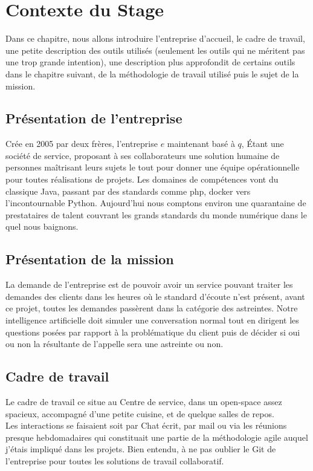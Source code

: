 
\chapter{Contexte du Stage}
Dans ce chapitre, nous allons introduire l'entreprise d'accueil, le cadre de travail, une petite description des outils utilisés (seulement les outils qui ne méritent pas une trop grande intention), une description plus approfondit de certains outils dans le chapitre suivant, de la méthodologie de travail utilisé puis le sujet de la mission.
\pagebreak

\section{Présentation de l'entreprise}
Crée en 2005 par deux frères, l'entreprise $e$ maintenant basé à $q$, Étant une société de service, proposant à ses collaborateurs une solution humaine de personnes maîtrisant leurs sujets le tout pour donner une équipe opérationnelle pour toutes réalisations de projets.\linebreak
Les domaines de compétences vont du classique Java, passant par des standards comme php, docker vers l'incontournable Python. Aujourd'hui nous comptons environ une quarantaine de prestataires de talent couvrant les grands standards du monde numérique dans le quel nous baignons.\linebreak

\section{Présentation de la mission}
La demande de l'entreprise est de pouvoir avoir un service pouvant traiter les demandes des clients dans les heures où le standard d'écoute n'est présent, avant ce projet, toutes les demandes passèrent dans la catégorie des astreintes. Notre intelligence artificielle doit simuler une conversation normal tout en dirigent les questions posées par rapport à la problématique du client puis de décider si oui ou non la résultante de l'appelle sera une astreinte ou non.
\pagebreak

\section{Cadre de travail}
Le cadre de travail ce situe au Centre de service, dans un open-space assez spacieux, accompagné d'une petite cuisine, et de quelque salles de repos.\\
Les interactions se faisaient soit par Chat écrit, par mail ou via les réunions presque hebdomadaires qui constituait une partie de la méthodologie agile auquel j'étais impliqué dans les projets.
Bien entendu, à ne pas oublier le Git de l'entreprise pour toutes les solutions de travail collaboratif.

